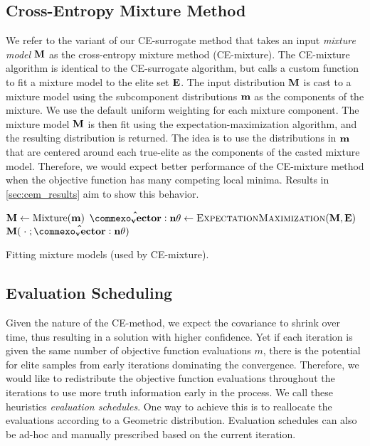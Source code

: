 \subsection{Cross-Entropy Mixture Method} \label{sec:cem_alg_ce_mixture}
We refer to the variant of our CE-surrogate method that takes an input \textit{mixture model} $\mathbf{M}$ as the cross-entropy mixture method (CE-mixture).
The CE-mixture algorithm is identical to the CE-surrogate algorithm, but calls a custom  function to fit a mixture model to the elite set $\mathbf{E}$.
The input distribution $\mathbf{M}$ is cast to a mixture model using the subcomponent distributions $\mathbf{m}$ as the components of the mixture.
We use the default uniform weighting for each mixture component.
The mixture model $\mathbf{M}$ is then fit using the expectation-maximization algorithm, and the resulting distribution is returned.
The idea is to use the distributions in $\mathbf{m}$ that are centered around each true-elite as the components of the casted mixture model.
Therefore, we would expect better performance of the CE-mixture method when the objective function has many competing local minima.
Results in \cref{sec:cem_results} aim to show this behavior.

\begin{algorithm}[ht]
  \begin{algorithmic}
    \State $\mathbf{M} \leftarrow \operatorname{Mixture}( \mathbf{m} )$
    \State $\mathbf{\hat{\vec{\theta}}} \leftarrow \textproc{ExpectationMaximization}(\M, \bfE)$
    \State \Return $\M(\;\cdot\;; \mathbf{\hat{\vec{\theta}}})$
  \EndFunction
  \end{algorithmic}
  \caption{\label{alg:ce_mixture_fit} Fitting mixture models (used by CE-mixture).}
\end{algorithm}


\subsection{Evaluation Scheduling} \label{sec:cem_alg_eval_schedule}
Given the nature of the CE-method, we expect the covariance to shrink over time, thus resulting in a solution with higher confidence.
Yet if each iteration is given the same number of objective function evaluations $m$, there is the potential for elite samples from early iterations dominating the convergence.
Therefore, we would like to redistribute the objective function evaluations throughout the iterations to use more truth information early in the process.
We call these heuristics \textit{evaluation schedules}.
One way to achieve this is to reallocate the evaluations according to a Geometric distribution.
Evaluation schedules can also be ad-hoc and manually prescribed based on the current iteration.

